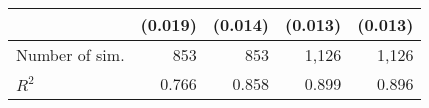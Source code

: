 \begin{table}
\begin{tabular}{lrrrr}
                &                  (0.019) &                  (0.014) &                  (0.013) &                  (0.013) \\       
    \midrule 
Number of sim.  &                      853 &                      853 &                    1,126 &                    1,126 \\       
    $R^2$       &                    0.766 &                    0.858 &                    0.899 &                    0.896 \\       
    \bottomrule
    \end{tabular}
    \label{tableSI:coefficients_set1}
\end{table}
\FloatBarrier

\begin{table}
  \caption{ Multivariate linear regression model coefficients for the effect of the topology metrics on $Q_{ST,u}$ and $Q_{ST,s}$ in the setting with heterogeneous selection. *** $P < 0.001$}
  \centering
\end{table}
